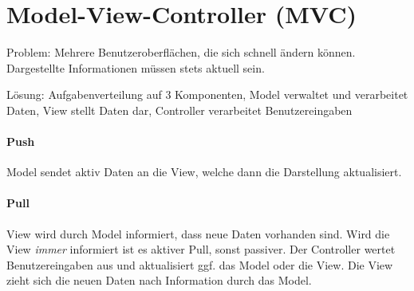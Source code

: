 \section{Model-View-Controller
(MVC)}\label{model-view-controller-mvc}

Problem: Mehrere Benutzeroberflächen, die sich schnell ändern können.
Dargestellte Informationen müssen stets aktuell sein.

Lösung: Aufgabenverteilung auf 3 Komponenten, Model verwaltet und verarbeitet
Daten, View stellt Daten dar, Controller verarbeitet Benutzereingaben

\paragraph{Push}\label{push-1}

Model sendet aktiv Daten an die View, welche dann die Darstellung
aktualisiert.

\paragraph{Pull}\label{pull-1}

View wird durch Model informiert, dass neue Daten vorhanden sind. Wird
die View \emph{immer} informiert ist es aktiver Pull, sonst passiver.
Der Controller wertet Benutzereingaben aus und aktualisiert ggf. das
Model oder die View. Die View zieht sich die neuen Daten nach
Information durch das Model.
